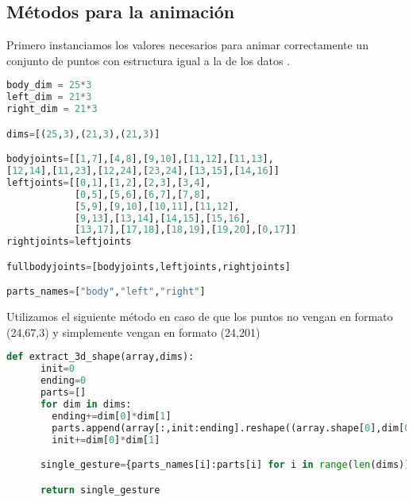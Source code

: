%
%
%  
%
%

\subsection{Métodos para la animación}
Primero instanciamos los valores necesarios para animar correctamente un conjunto de puntos con estructura igual a la de los datos .

\begin{lstlisting}[language=Python, caption={Instanciar datos necesarios para animar }]
body_dim = 25*3
left_dim = 21*3
right_dim = 21*3

dims=[(25,3),(21,3),(21,3)]

bodyjoints=[[1,7],[4,8],[9,10],[11,12],[11,13],
[12,14],[11,23],[12,24],[23,24],[13,15],[14,16]]
leftjoints=[[0,1],[1,2],[2,3],[3,4],
            [0,5],[5,6],[6,7],[7,8],
            [5,9],[9,10],[10,11],[11,12],
            [9,13],[13,14],[14,15],[15,16],
            [13,17],[17,18],[18,19],[19,20],[0,17]]
rightjoints=leftjoints

fullbodyjoints=[bodyjoints,leftjoints,rightjoints]

parts_names=["body","left","right"]
\end{lstlisting}

Utilizamos el siguiente método en caso de que los puntos no vengan en formato (24,67,3) y simplemente vengan en formato (24,201)

\begin{lstlisting}[language=Python, caption={Extraer las partes en 3d }]
def extract_3d_shape(array,dims):
      init=0
      ending=0
      parts=[]
      for dim in dims:
        ending+=dim[0]*dim[1]
        parts.append(array[:,init:ending].reshape((array.shape[0],dim[0],dim[1])))
        init+=dim[0]*dim[1]

      single_gesture={parts_names[i]:parts[i] for i in range(len(dims))}

      return single_gesture
\end{lstlisting}

